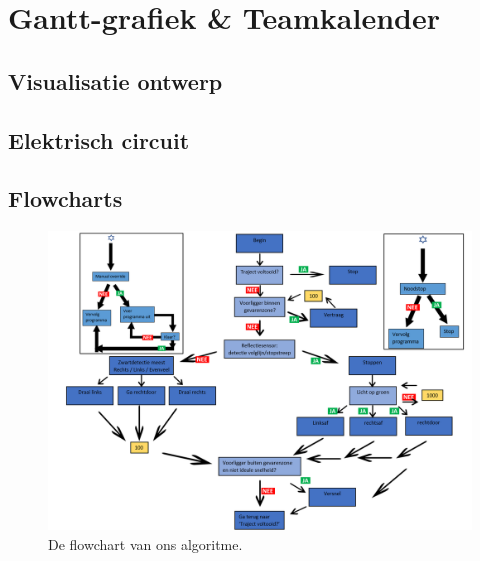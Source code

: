 \documentclass[a4paper,twoside,kulak]{kulakreport}
\begin{document}
	
	\section{Gantt-grafiek \& Teamkalender}
	\label{sec: kale}
	
	
	
	
	
	
	
	
	
	
	\subsection{Visualisatie ontwerp}
	\label{sec: vis}
	


\subsection{Elektrisch circuit}
\label{sec: circ}

\subsection{Flowcharts}
\label{sec: flowchart}

\begin{figure}
	\centering
	\includegraphics[width=1.3\textwidth]{fchart}
	\caption{De flowchart van ons algoritme. 
	}
	\label{fig: fchart}
	
\end{figure}
\end{document}
